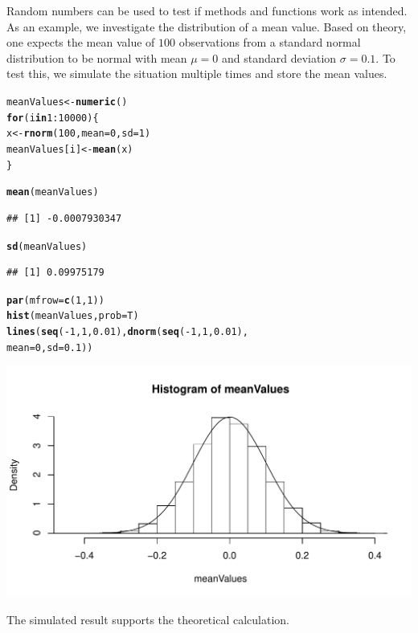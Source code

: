 \documentclass{article}\usepackage[]{graphicx}\usepackage[]{color}
\makeatletter
\def\maxwidth{ %
  \ifdim\Gin@nat@width>\linewidth
    \linewidth
  \else
    \Gin@nat@width
  \fi
}
\newcommand{\hlnum}[1]{\textcolor[rgb]{0.686,0.059,0.569}{#1}}%
\newcommand{\hlopt}[1]{\textcolor[rgb]{0,0,0}{#1}}%
\newcommand{\hlstd}[1]{\textcolor[rgb]{0.345,0.345,0.345}{#1}}%
\newcommand{\hlkwa}[1]{\textcolor[rgb]{0.161,0.373,0.58}{\textbf{#1}}}%
\newcommand{\hlkwb}[1]{\textcolor[rgb]{0.69,0.353,0.396}{#1}}%
\newcommand{\hlkwc}[1]{\textcolor[rgb]{0.333,0.667,0.333}{#1}}%
\newcommand{\hlkwd}[1]{\textcolor[rgb]{0.737,0.353,0.396}{\textbf{#1}}}%
\newenvironment{kframe}{%
 \def\at@end@of@kframe{}%
 \ifinner\ifhmode%
  \def\at@end@of@kframe{\end{minipage}}%
  \begin{minipage}{\columnwidth}%
 \fi\fi%
 \def\FrameCommand##1{\hskip\@totalleftmargin \hskip-\fboxsep
 \colorbox{shadecolor}{##1}\hskip-\fboxsep
     \hskip-\linewidth \hskip-\@totalleftmargin \hskip\columnwidth}%
 \MakeFramed {\advance\hsize-\width
   \@totalleftmargin\z@ \linewidth\hsize
   \@setminipage}}%
 {\par\unskip\endMakeFramed%
 \at@end@of@kframe}
\newenvironment{knitrout}{}{} %
\makeatother
\begin{document}
Random numbers can be used to test if methods and functions work as intended.
As an example, we investigate the distribution of a mean value. Based on theory, one expects the mean value of $100$ observations from a standard normal distribution to be normal with mean $\mu=0$ and standard deviation $\sigma = 0.1$. To test this, we simulate the situation multiple times and store the mean values.
\begin{knitrout}
\color{fgcolor}\begin{kframe}
\begin{alltt}
\hlstd{meanValues} \hlkwb{<-} \hlkwd{numeric}\hlstd{()}
\hlkwa{for}\hlstd{(i} \hlkwa{in} \hlnum{1}\hlopt{:}\hlnum{10000}\hlstd{)\{}
  \hlstd{x} \hlkwb{<-} \hlkwd{rnorm}\hlstd{(}\hlnum{100}\hlstd{,} \hlkwc{mean} \hlstd{=} \hlnum{0}\hlstd{,} \hlkwc{sd} \hlstd{=} \hlnum{1}\hlstd{)}
  \hlstd{meanValues[i]} \hlkwb{<-} \hlkwd{mean}\hlstd{(x)}
\hlstd{\}}

\hlkwd{mean}\hlstd{(meanValues)}
\end{alltt}
\begin{verbatim}
## [1] -0.0007930347
\end{verbatim}
\begin{alltt}
\hlkwd{sd}\hlstd{(meanValues)}
\end{alltt}
\begin{verbatim}
## [1] 0.09975179
\end{verbatim}
\begin{alltt}
\hlkwd{par}\hlstd{(}\hlkwc{mfrow} \hlstd{=} \hlkwd{c}\hlstd{(}\hlnum{1}\hlstd{,}\hlnum{1}\hlstd{))}
\hlkwd{hist}\hlstd{(meanValues,} \hlkwc{prob} \hlstd{= T)}
\hlkwd{lines}\hlstd{(}\hlkwd{seq}\hlstd{(}\hlopt{-}\hlnum{1}\hlstd{,} \hlnum{1}\hlstd{,} \hlnum{0.01}\hlstd{),} \hlkwd{dnorm}\hlstd{(}\hlkwd{seq}\hlstd{(}\hlopt{-}\hlnum{1}\hlstd{,} \hlnum{1}\hlstd{,} \hlnum{0.01}\hlstd{),}
                              \hlkwc{mean} \hlstd{=} \hlnum{0}\hlstd{,} \hlkwc{sd} \hlstd{=} \hlnum{0.1}\hlstd{))}
\end{alltt}
\end{kframe}

{\centering \includegraphics[width=\maxwidth]{figure/unnamed-chunk-25-1} 

}



\end{knitrout}
The simulated result supports the theoretical calculation.
\end{document}
